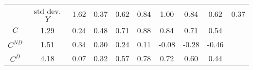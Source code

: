 \begin{tabular}{ccccccccc}
\toprule
 & std dev. %
\midrule
$Y$ & 1.62 & 0.37 & 0.62 & 0.84 & 1.00 & 0.84 & 0.62 & 0.37 \\
$C$ & 1.29 & 0.24 & 0.48 & 0.71 & 0.88 & 0.84 & 0.71 & 0.54 \\
$C^{ND}$ & 1.51 & 0.34 & 0.30 & 0.24 & 0.11 & -0.08 & -0.28 & -0.46 \\
$C^{D}$ & 4.18 & 0.07 & 0.32 & 0.57 & 0.78 & 0.72 & 0.60 & 0.44 \\
\bottomrule
\end{tabular}
